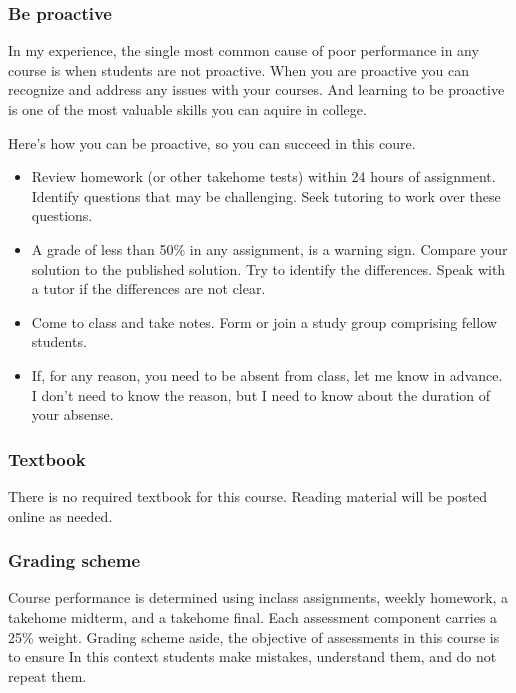\documentclass[letterpaper,10pt,english]{sphinxmanual}
\begin{document}
\subsubsection{Be proactive}
\label{\detokenize{COMP163/organization:be-proactive}}
In my experience, the single most common cause of poor performance in any course is when students are not proactive. When you are proactive you can recognize and address any issues with your courses. And learning to be proactive is one of the most valuable skills you can aquire in college.

Here’s how you can be proactive, so you can succeed in this coure.
\begin{itemize}
\item {} 
Review homework (or other take\sphinxhyphen{}home tests) within 24 hours of assignment. Identify questions that may be challenging. Seek tutoring to work over these questions. 

\item {} 
A grade of less than 50\% in any assignment, is a warning sign. Compare your solution to the published solution. Try to identify the differences. Speak with a tutor if the differences are not clear.

\item {} 
Come to class and take notes. Form or join a study group comprising fellow students.

\item {} 
If, for any reason, you need to be absent from class, let me know in advance. I don’t need to know the reason, but I need to know about the duration of your absense.

\end{itemize}


\subsubsection{Textbook}
\label{\detokenize{COMP163/organization:textbook}}
There is no required textbook for this course. Reading material will be posted online as needed.


\subsubsection{Grading scheme}
\label{\detokenize{COMP163/organization:grading-scheme}}
Course performance is determined using in\sphinxhyphen{}class assignments, weekly homework, a take\sphinxhyphen{}home midterm, and a take\sphinxhyphen{}home final. Each assessment component carries a 25\% weight. Grading scheme aside, the objective of assessments in this course is to ensure  In this context students make mistakes, understand them, and do not repeat them.
\end{document}
